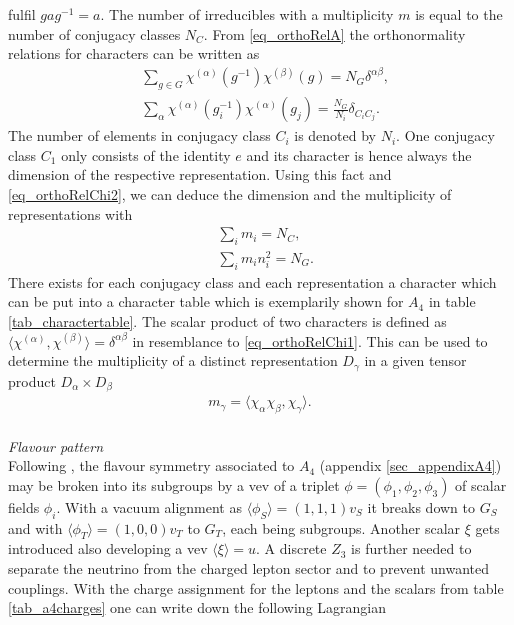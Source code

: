 fulfil $gag^{-1}=a$.  The number of irreducibles with a multiplicity $m$ is equal to the number of conjugacy classes $N_C$. From \eqref{eq_orthoRelA} the 
orthonormality relations for characters can be written as
\begin{align}
 &\sum\limits_{g\in G} \chi^{(\alpha)}(g^{-1})\chi^{(\beta)}(g) = N_G \delta^{\alpha\beta},\label{eq_orthoRelChi1}\\
 &\sum\limits_\alpha \chi^{(\alpha)}(g^{-1}_i)\chi^{(\alpha)}(g_j) = \frac{N_G}{N_i} \delta_{C_iC_j}.
 \label{eq_orthoRelChi2}
\end{align}
The number of elements in conjugacy class $C_i$ is denoted by $N_i$. One conjugacy class $C_1$ only consists of the identity $e$ and its character 
is hence always the dimension of the respective representation. Using this fact and \eqref{eq_orthoRelChi2}, we can deduce the dimension and the
multiplicity of representations with 
\begin{align}
 &\sum\limits_i m_i = N_C,\label{eq_multi1}\\
 &\sum\limits_i m_i n_i ^2 = N_G.\label{eq_multi2}
\end{align}
There exists for each conjugacy class and each representation a character which can be put into a character table which is exemplarily shown
for $A_4$ in table \ref{tab_charactertable}. The scalar product of two characters is defined as 
$\langle \chi^{(\alpha)},\chi^{(\beta)}\rangle=\delta^{\alpha\beta}$ in resemblance to \eqref{eq_orthoRelChi1}. This can be used to determine 
the multiplicity of a distinct representation $D_\gamma$ in a given tensor product $D_\alpha\times D_\beta$ \cite{1273369} 
\begin{align}
 m_\gamma = \langle \chi_\alpha \chi_\beta,\chi_\gamma\rangle.
 \label{eq_multiplicity}
\end{align}
 \\ \textit{Flavour pattern}\\
\noindent Following \cite{0512103}, the flavour symmetry associated to $A_4$ 
(appendix \ref{sec_appendixA4}) may be broken into its subgroups by a vev of a triplet 
$\phi=(\phi_1,\phi_2,\phi_3)$ of scalar fields $\phi_i$. With a vacuum alignment as $\langle\phi_S\rangle = (1,1,1)v_S$ it breaks down to $G_S$
and with $\langle\phi_T\rangle=(1,0,0)v_T$ to $G_T$, each being subgroups. Another scalar $\xi$ gets introduced also developing a vev $\langle\xi\rangle=u$. 
A discrete $Z_3$ is further needed to separate the neutrino from the charged lepton sector and to prevent unwanted couplings.
With the charge assignment for the leptons and the scalars from table \ref{tab_a4charges} one can write down the following Lagrangian
